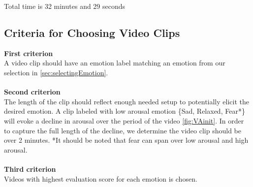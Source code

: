 Total time is 32 minutes and 29 seconds

\subsection{Criteria for Choosing Video Clips}

\textbf{First criterion}\\
A video clip should have an emotion label matching an emotion from our selection in \cref{sec:selectingEmotion}.
\\ \\
\textbf{Second criterion}\\
The length of the clip should reflect enough needed setup to potentially elicit the desired emotion. A clip labeled with low arousal emotion \{Sad, Relaxed, Fear*\} will evoke a decline in arousal over the period of the video \cref{fig:VAinit}. In order to capture the full length of the decline, we determine the video clip should be over 2 minutes. *It should be noted that fear can span over low arousal and high arousal.
\\ \\
\textbf{Third criterion}\\
Videos with highest evaluation score for each emotion is chosen.
\\ \\
